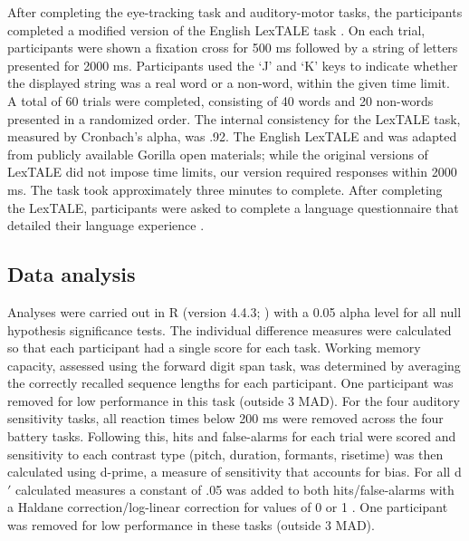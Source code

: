 After completing the eye-tracking task and auditory-motor tasks, the participants completed a modified version of the English LexTALE task \parencite{lemhofer2012introducing}. On each trial, participants were shown a fixation cross for 500 ms followed by a string of letters presented for 2000 ms. Participants used the ‘J’ and ‘K’ keys to indicate whether the displayed string was a real word or a non-word, within the given time limit. A total of 60 trials were completed, consisting of 40 words and 20 non-words presented in a randomized order. The internal consistency for the LexTALE task, measured by Cronbach’s alpha, was .92. The English LexTALE and was adapted from publicly available Gorilla open materials; while the original versions of LexTALE did not impose time limits, our version required responses within 2000 ms. The task took approximately three minutes to complete. After completing the LexTALE, participants were asked to complete a language questionnaire that detailed their language experience \parencite{Marian_Blumenfeld_Kaushanskaya_2007}. 


\subsection{Data analysis}

Analyses were carried out in R (version 4.4.3; \cite{R}) with a 0.05 alpha level for all null hypothesis significance tests. The individual difference measures were calculated so that each participant had a single score for each task. Working memory capacity, assessed using the forward digit span task, was determined by averaging the correctly recalled sequence lengths for each participant. One participant was removed for low performance in this task (outside 3 MAD). For the four auditory sensitivity tasks, all reaction times below 200 ms were removed across the four battery tasks. Following this, hits and false-alarms for each trial were scored and sensitivity to each contrast type (pitch, duration, formants, risetime) was then calculated using d-prime, a measure of sensitivity that accounts for bias. For all d$'$ calculated measures a constant of .05 was added to both hits/false-alarms with a Haldane correction/log-linear correction for values of 0 or 1 \parencite{Hautus1995}. One participant was removed for low performance in these tasks (outside 3 MAD).

